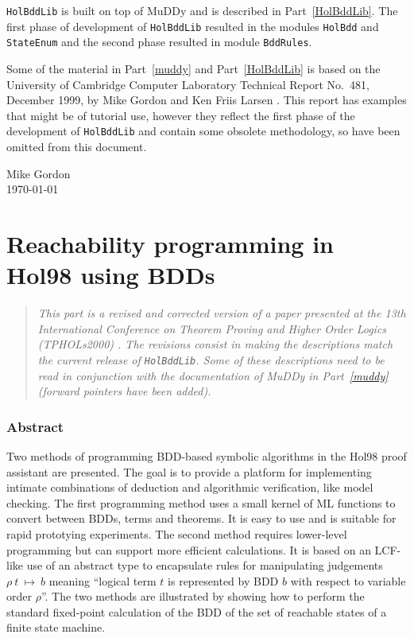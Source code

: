\documentclass[12pt]{article}
\newcommand{\ml}[1]{{\tt #1}}
\newcommand{\termbdd}[3]{\mbox{$#1~#2~\mapsto~#3$}}
\newcommand\Hol{Hol98\xspace}
\newcommand{\Muddy}{MuDDy\xspace}
\begin{document}
{\tt HolBddLib} is built on top of \Muddy{} and
is described in Part~\ref{HolBddLib}.
The first phase of development of {\tt HolBddLib} resulted in the
modules {\tt HolBdd} and {\tt StateEnum} and the second phase resulted
in module {\tt BddRules}.

Some of the material in Part~\ref{muddy} and Part~\ref{HolBddLib} 
is based on the University of Cambridge Computer Laboratory Technical
Report No.~481, December 1999, by Mike Gordon and Ken Friis Larsen
\cite{GordonLarsen}. This report has examples that might be of
tutorial use, however they reflect the first phase of the development
of {\tt HolBddLib} and contain some obsolete methodology, so have been
omitted from this document.

\vfill

\begin{flushright}
Mike Gordon\\
\today
\end{flushright}


\newpage

{\baselineskip10pt
\tableofcontents
}

\newpage
                     
\part{Reachability programming in \Hol{} using BDDs}\label{overview}


\begin{quote}\it
This part is a revised and corrected version of a paper presented at the 13th International
Conference on Theorem Proving and Higher Order Logics (TPHOLs2000)
\cite{Gordon:TPHOLs2000}. The revisions consist in making
the descriptions match the current release of \ml{HolBddLib}.
Some of these descriptions need to be read in conjunction with
the documentation of \Muddy{} in Part~\ref{muddy} (forward pointers have been added).
\end{quote}

\section{Abstract}
Two methods of programming BDD-based symbolic algorithms in the Hol98
proof assistant are presented. The goal is to provide a platform for
implementing intimate combinations of deduction and algorithmic
verification, like model checking.  The first programming method uses
a small kernel of ML functions to convert between BDDs, terms and
theorems. It is easy to use and is suitable for rapid prototying
experiments.  The second method requires lower-level programming but
can support more efficient calculations. It is based on an LCF-like
use of an abstract type to encapsulate rules for manipulating
judgements $\termbdd{\rho}{t}{b}$ meaning ``logical term $t$ is
represented by BDD $b$ with respect to variable order $\rho$''.  The
two methods are illustrated by showing how to perform the standard
fixed-point calculation of the BDD of the set of reachable states of a
finite state machine.
\end{document}
